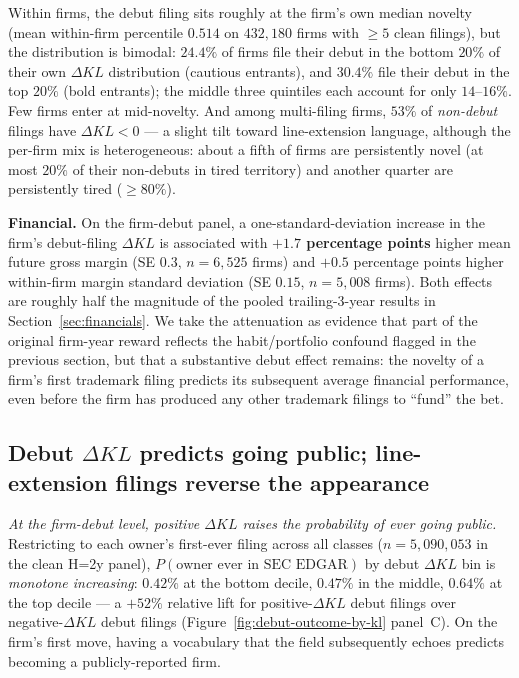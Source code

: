 \documentclass[11pt]{article}
\begin{document}
Within firms, the debut filing sits roughly at the firm's own median
novelty (mean within-firm percentile $0.514$ on $432{,}180$ firms with
$\geq 5$ clean filings), but the distribution is bimodal:
$24.4\%$ of firms file their debut in the bottom $20\%$ of their own
$\Delta KL$ distribution (cautious entrants), and $30.4\%$ file their
debut in the top $20\%$ (bold entrants); the middle three quintiles each
account for only $14$--$16\%$. Few firms enter at mid-novelty. And among
multi-filing firms, $53\%$ of \emph{non-debut} filings have $\Delta KL <
0$ — a slight tilt toward line-extension language, although the per-firm
mix is heterogeneous: about a fifth of firms are persistently novel
(at most $20\%$ of their non-debuts in tired territory) and another
quarter are persistently tired ($\geq 80\%$).

\textbf{Financial.} On the firm-debut panel, a one-standard-deviation
increase in the firm's debut-filing $\Delta KL$ is associated with
\textbf{$+1.7$ percentage points} higher mean future gross margin (SE
$0.3$, $n = 6{,}525$ firms) and $+0.5$ percentage points higher
within-firm margin standard deviation (SE $0.15$, $n = 5{,}008$
firms). Both effects are roughly half the magnitude of the pooled
trailing-3-year results in Section~\ref{sec:financials}. We take the
attenuation as evidence that part of the original firm-year reward
reflects the habit/portfolio confound flagged in the previous section,
but that a substantive debut effect
remains: the novelty of a firm's first trademark filing predicts its
subsequent average financial performance, even before the firm has
produced any other trademark filings to ``fund'' the bet.

\subsection*{Debut $\Delta KL$ predicts going public; line-extension
filings reverse the appearance}
\label{sec:debut-ipo}

\emph{At the firm-debut level, positive $\Delta KL$ raises the
probability of ever going public.} Restricting to each owner's
first-ever filing across all classes ($n = 5{,}090{,}053$ in the
clean H=2y panel), $P(\text{owner ever in SEC EDGAR})$ by debut
$\Delta KL$ bin is \emph{monotone increasing}: $0.42\%$ at the
bottom decile, $0.47\%$ in the middle, $0.64\%$ at the top decile ---
a $+52\%$ relative lift for positive-$\Delta KL$ debut filings over
negative-$\Delta KL$ debut filings (Figure~\ref{fig:debut-outcome-by-kl}
panel~C). On the firm's first move, having a vocabulary that the
field subsequently echoes predicts becoming a publicly-reported
firm.
\end{document}

